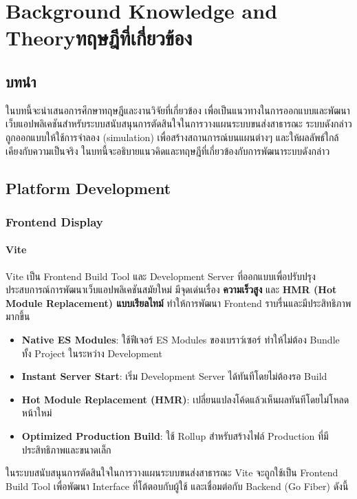 \chapter{\ifenglish Background Knowledge and Theory\else ทฤษฎีที่เกี่ยวข้อง\fi}

\section{บทนำ}
  \sloppy\indent ในบทนี้จะนำเสนอการศึกษาทฤษฎีและงานวิจัยที่เกี่ยวข้อง เพื่อเป็นแนวทางในการออกแบบและพัฒนาเว็บแอปพลิเคชันสำหรับระบบสนับสนุนการตัดสินใจในการวางแผนระบบขนส่งสาธารณะ 
  ระบบดังกล่าวถูกออกแบบให้ใช้การจำลอง (simulation) เพื่อสร้างสถานการณ์บนแผนต่างๆ 
  และให้ผลลัพธ์ใกล้เคียงกับความเป็นจริง ในบทนี้จะอธิบายแนวคิดและทฤษฎีที่เกี่ยวข้องกับการพัฒนาระบบดังกล่าว

\section{Platform Development}

\subsection{Frontend Display}
\subsubsection{Vite}
\indent Vite เป็น Frontend Build Tool และ Development Server ที่ออกแบบเพื่อปรับปรุงประสบการณ์การพัฒนาเว็บแอปพลิเคชันสมัยใหม่ มีจุดเด่นเรื่อง \textbf{ความเร็วสูง} และ \textbf{HMR (Hot Module Replacement) แบบเรียลไทม์} ทำให้การพัฒนา Frontend ราบรื่นและมีประสิทธิภาพมากขึ้น  

\begin{itemize}
    \item \textbf{Native ES Modules}: ใช้ฟีเจอร์ ES Modules ของเบราว์เซอร์ ทำให้ไม่ต้อง Bundle ทั้ง Project ในระหว่าง Development
    \item \textbf{Instant Server Start}: เริ่ม Development Server ได้ทันทีโดยไม่ต้องรอ Build
    \item \textbf{Hot Module Replacement (HMR)}: เปลี่ยนแปลงโค้ดแล้วเห็นผลทันทีโดยไม่โหลดหน้าใหม่
    \item \textbf{Optimized Production Build}: ใช้ Rollup สำหรับสร้างไฟล์ Production ที่มีประสิทธิภาพและขนาดเล็ก
\end{itemize}

ในระบบสนับสนุนการตัดสินใจในการวางแผนระบบขนส่งสาธารณะ Vite จะถูกใช้เป็น Frontend Build Tool เพื่อพัฒนา Interface ที่โต้ตอบกับผู้ใช้ และเชื่อมต่อกับ Backend (Go Fiber) ดังนี้

